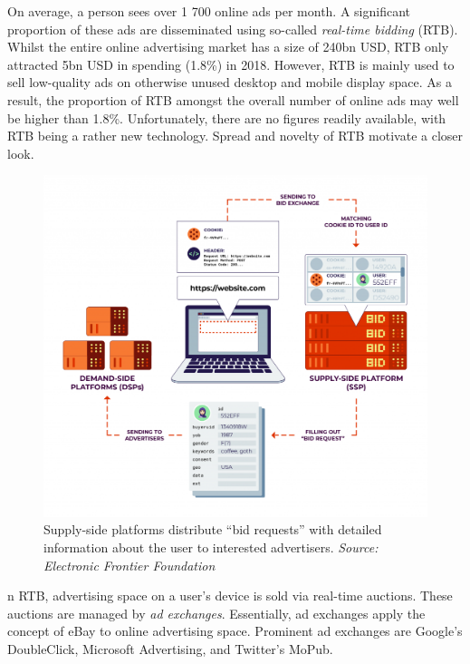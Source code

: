 \documentclass[
]{book}
\begin{document}
On average, a person sees over 1 700 online ads per month. A significant proportion of these ads are disseminated using so-called \emph{real-time bidding} (RTB). Whilst the entire online advertising market has a size of 240bn USD, RTB only attracted 5bn USD in spending (1.8\%) in 2018. However, RTB is mainly used to sell low-quality ads on otherwise unused desktop and mobile display space. As a result, the proportion of RTB amongst the overall number of online ads may well be higher than 1.8\%. Unfortunately, there are no figures readily available, with RTB being a rather new technology. Spread and novelty of RTB motivate a closer look.

\begin{figure}
\centering
\includegraphics{images/real-time-bidding.png}
\caption{Supply-side platforms distribute ``bid requests'' with detailed information about the user to interested advertisers. \emph{Source: Electronic Frontier Foundation}}
\end{figure}

n RTB, advertising space on a user's device is sold via real-time auctions. These auctions are managed by \emph{ad exchanges}. Essentially, ad exchanges apply the concept of eBay to online advertising space. Prominent ad exchanges are Google's DoubleClick, Microsoft Advertising, and Twitter's MoPub.
\end{document}

